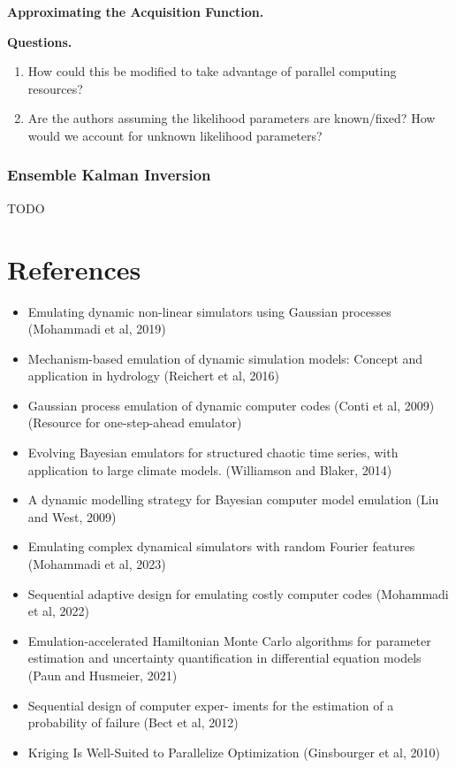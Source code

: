 \documentclass[12pt]{article}
\begin{document}
\bigskip
\noindent
\textbf{Approximating the Acquisition Function.}

\bigskip
\noindent
\textbf{Questions.}
\begin{enumerate}
\item How could this be modified to take advantage of parallel computing resources? 
\item Are the authors assuming the likelihood parameters are known/fixed? How would we account for unknown likelihood parameters? 
\end{enumerate}

\subsubsection{Ensemble Kalman Inversion}
TODO


 



\section{References}
\begin{itemize}
\item Emulating dynamic non-linear simulators using Gaussian processes (Mohammadi et al, 2019)
\item Mechanism-based emulation of dynamic simulation models: Concept and application in hydrology (Reichert et al, 2016)
\item Gaussian process emulation of dynamic computer codes (Conti et al, 2009) (Resource for one-step-ahead emulator)
\item Evolving Bayesian emulators for structured chaotic time series, with application to large climate models. (Williamson and Blaker, 2014)
\item A dynamic modelling strategy for Bayesian computer model emulation (Liu and West, 2009)
\item Emulating complex dynamical simulators with random Fourier features (Mohammadi et al, 2023)
\item Sequential adaptive design for emulating costly computer codes (Mohammadi et al, 2022)
\item Emulation-accelerated Hamiltonian Monte Carlo algorithms for parameter estimation and uncertainty quantification in differential equation models (Paun and Husmeier, 2021)
\item Sequential design of computer exper- iments for the estimation of a probability of failure (Bect et al, 2012)
\item Kriging Is Well-Suited to Parallelize Optimization (Ginsbourger et al, 2010)
\end{itemize}
\end{document}
